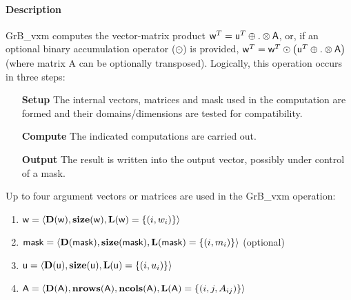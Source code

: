 \paragraph{Description}

{\sf GrB\_vxm} computes the vector-matrix product ${\sf w}^T = {\sf
u}^T \oplus . \otimes {\sf A}$, or, if an optional binary accumulation
operator ($\odot$) is provided, ${\sf w}^T = {\sf w}^T \odot
\left({\sf u}^T \oplus . \otimes {\sf A}\right)$ (where matrix {\sf A}
 can be optionally transposed).  Logically, this operation
occurs in three steps:
\begin{enumerate}[leftmargin=0.85in]
\item[\bf Setup] The internal vectors, matrices and mask used in the computation are formed and their domains/dimensions are tested for compatibility.
\item[\bf Compute] The indicated computations are carried out.
\item[\bf Output] The result is written into the output vector, possibly under control of a mask.
\end{enumerate}

Up to four argument vectors or matrices are used in the {\sf GrB\_vxm} operation:
\begin{enumerate}
	\item ${\sf w} = \langle \bold{D}({\sf w}),\bold{size}({\sf w}),\bold{L}({\sf w}) = \{(i,w_i) \} \rangle$
	\item ${\sf mask} = \langle \bold{D}({\sf mask}),\bold{size}({\sf mask}),\bold{L}({\sf mask}) = \{(i,m_i) \} \rangle$ (optional)
	\item ${\sf u} = \langle \bold{D}({\sf u}),\bold{size}({\sf u}),\bold{L}({\sf u}) = \{(i,u_i) \} \rangle$
	\item ${\sf A} = \langle \bold{D}({\sf A}),\bold{nrows}({\sf A}), \bold{ncols}({\sf A}),\bold{L}({\sf A}) = \{(i,j,A_{ij}) \} \rangle$
\end{enumerate}


